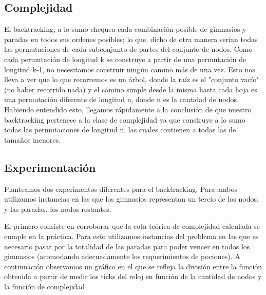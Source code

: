 \subsection{Complejidad}

El backtracking, a lo sumo chequea cada combinación posible de gimnasios y paradas en todos sus ordenes posibles; lo que, dicho de otra manera serían todas las permutaciones de cada subconjunto de partes del conjunto de nodos. 
Como cada permutación de longitud k se construye a partir de una permutación de longitud k-1, no necesitamos construir ningún camino más de una vez.
Esto nos lleva a ver que lo que recorremos es un árbol, donde la raíz es el "conjunto vacío" (no haber recorrido nada) y el camino simple desde la misma hasta cada hoja es una permutación diferente de longitud n, donde n es la cantidad de nodos.
Habiendo entendido esto, llegamos rápidamente a la conclusión de que nuestro backtracking pertenece a la clase de complejidad  ya que construye a lo sumo todas las permutaciones de longitud n, las cuales contienen a todas las de tamaños menores.


\subsection{Experimentaci\'on}

Planteamos dos experimentos diferentes para el backtracking. Para ambos utilizamos instancias en las que los gimnasios representan un tercio de los nodos, y las paradas, los nodos restantes.

El primero consiste en corroborar que la cota teórica de complejidad calculada se cumple en la práctica. Para esto utilizamos instancias del problema en las que es necesario pasar por la totalidad de las paradas para poder vencer en todos los gimnasios (acomodando adecuadamente los requerimientos de pociones). 
A continuación observamos un gráfico en el que se refleja la división entre la función obtenida a partir de medir los ticks del reloj en función de la cantidad de nodos y la función de complejidad

